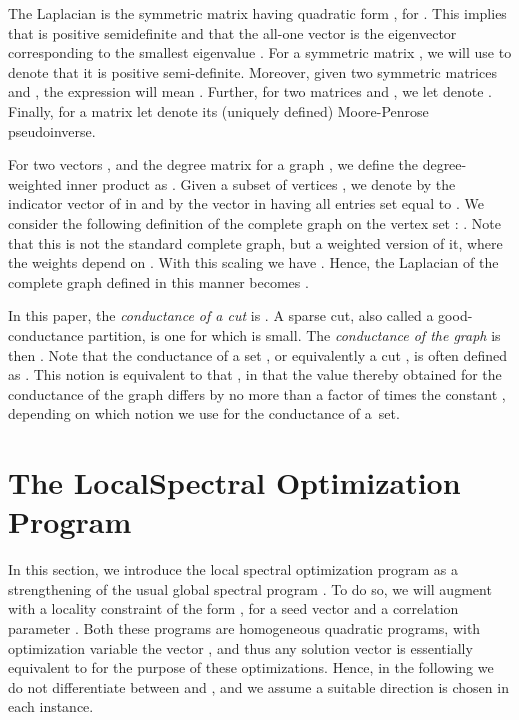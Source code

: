 \documentclass[11pt]{article}
\begin{document}
The Laplacian is the symmetric matrix having quadratic form 
, for . 
This implies that  is positive semidefinite and that the all-one vector 
 is the eigenvector corresponding to the smallest 
eigenvalue .
For a symmetric matrix , we will use  to denote that it is 
positive semi-definite.
Moreover, given two symmetric matrices  and , the expression 
 will mean .
Further, for two  matrices  and , we let  
denote . 
Finally, for a matrix  let  denote its (uniquely defined) 
Moore-Penrose pseudoinverse.

For two vectors , and the degree matrix  for a 
graph , we define the degree-weighted inner product as
.
Given a subset of vertices , we denote by  the indicator 
vector of  in  and by  the vector in  
having all entries set equal to .
We consider the following definition of the complete graph  on the 
vertex set : .
Note that this is not the standard complete graph, but a weighted version of 
it, where the weights depend on .
With this scaling we have .
Hence, the Laplacian of the complete graph defined in this manner becomes
.

In this paper, the \emph{conductance  of a cut } is 
.
A sparse cut, also called a good-conductance partition, is one for which 
 is small.
The \emph{conductance of the graph } is then
.
Note that the conductance of a set , or equivalently a cut , is often 
defined as . 
This notion is equivalent to that , in that the value 
 thereby obtained for the conductance of the graph  differs by 
no more than a factor of  times the constant , depending on 
which notion we use for the conductance of a~set.  



\section{The \textsf{LocalSpectral} Optimization Program}
\label{sxn:optimize}

In this section, we introduce the local spectral optimization program 
 as a strengthening of the usual
global spectral program .
To do so, we will augment  with a locality constraint
of the form , for a seed vector  and a correlation
parameter .
Both these programs are homogeneous quadratic programs, with optimization 
variable the vector , and thus any solution vector  
is essentially equivalent to  for the purpose of these optimizations. 
Hence, in the following we do not differentiate between  and , and we 
assume a suitable direction is chosen in each instance.
\end{document}
